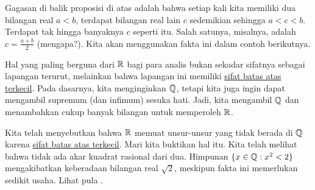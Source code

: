 Gagasan di balik proposisi di atas adalah bahwa
setiap kali kita memiliki dua bilangan real $a < b$, terdapat bilangan
real lain $c$ sedemikian sehingga
$a < c < b$.  Terdapat tak hingga banyaknya $c$ seperti itu.  Salah satunya, misalnya, adalah
$c = \frac{a+b}{2}$ (mengapa?).
Kita akan menggunakan fakta ini dalam contoh berikutnya.

Hal yang paling berguna dari ${\mathbb{R}}$ bagi para analis
bukan sekadar sifatnya sebagai lapangan terurut, melainkan bahwa lapangan ini memiliki
\hyperref[defn:lub]{sifat batas atas terkecil}.
Pada dasarnya, kita menginginkan ${\mathbb{Q}}$, tetapi kita juga
ingin dapat mengambil supremum (dan infimum) sesuka hati.
Jadi, kita mengambil ${\mathbb{Q}}$ dan menambahkan cukup banyak bilangan untuk memperoleh ${\mathbb{R}}$.

Kita telah menyebutkan bahwa ${\mathbb{R}}$ memuat unsur-unsur yang tidak berada di ${\mathbb{Q}}$
karena \hyperref[defn:lub]{sifat batas atas terkecil}.  Mari kita
buktikan hal itu.
Kita telah melihat bahwa tidak ada
akar kuadrat rasional dari dua.  Himpunan
$\{ x \in {\mathbb{Q}} : x^2 < 2 \}$ mengakibatkan keberadaan bilangan real
$\sqrt{2}$, meskipun fakta ini memerlukan sedikit usaha.  Lihat pula
.

